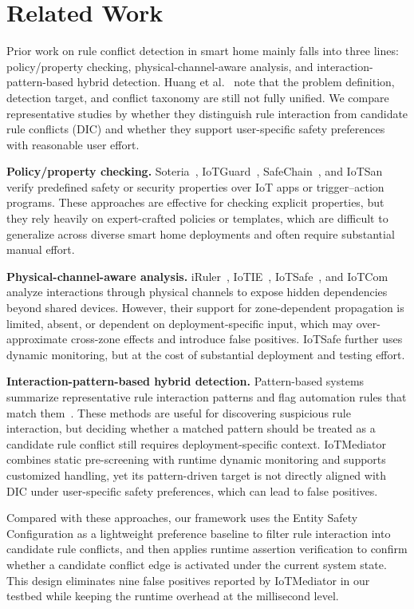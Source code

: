 \section{Related Work}

Prior work on rule conflict detection in smart home mainly falls into three lines: policy/property checking, physical-channel-aware analysis, and interaction-pattern-based hybrid detection. Huang et al.~\cite{huang2023survey} note that the problem definition, detection target, and conflict taxonomy are still not fully unified. We compare representative studies by whether they distinguish rule interaction from candidate rule conflicts (DIC) and whether they support user-specific safety preferences with reasonable user effort.

\textbf{Policy/property checking.} Soteria~\cite{celik2018soteria}, IoTGuard~\cite{celik2019iotguard}, SafeChain~\cite{hsu2019safechain}, and IoTSan~\cite{nguyen2018iotsan} verify predefined safety or security properties over IoT apps or trigger--action programs. These approaches are effective for checking explicit properties, but they rely heavily on expert-crafted policies or templates, which are difficult to generalize across diverse smart home deployments and often require substantial manual effort.

\textbf{Physical-channel-aware analysis.} iRuler~\cite{wang2019charting}, IoTIE~\cite{chen2019multi}, IoTSafe~\cite{ding2021iotsafe}, and IoTCom~\cite{alhanahnah2022iotcom} analyze interactions through physical channels to expose hidden dependencies beyond shared devices. However, their support for zone-dependent propagation is limited, absent, or dependent on deployment-specific input, which may over-approximate cross-zone effects and introduce false positives. IoTSafe further uses dynamic monitoring, but at the cost of substantial deployment and testing effort.

\textbf{Interaction-pattern-based hybrid detection.} Pattern-based systems summarize representative rule interaction patterns and flag automation rules that match them~\cite{trimananda2020understanding,chi2020cross,chi2023detecting}. These methods are useful for discovering suspicious rule interaction, but deciding whether a matched pattern should be treated as a candidate rule conflict still requires deployment-specific context. IoTMediator~\cite{chi2023detecting} combines static pre-screening with runtime dynamic monitoring and supports customized handling, yet its pattern-driven target is not directly aligned with DIC under user-specific safety preferences, which can lead to false positives.

Compared with these approaches, our framework uses the Entity Safety Configuration as a lightweight preference baseline to filter rule interaction into candidate rule conflicts, and then applies runtime assertion verification to confirm whether a candidate conflict edge is activated under the current system state. This design eliminates nine false positives reported by IoTMediator in our testbed while keeping the runtime overhead at the millisecond level.